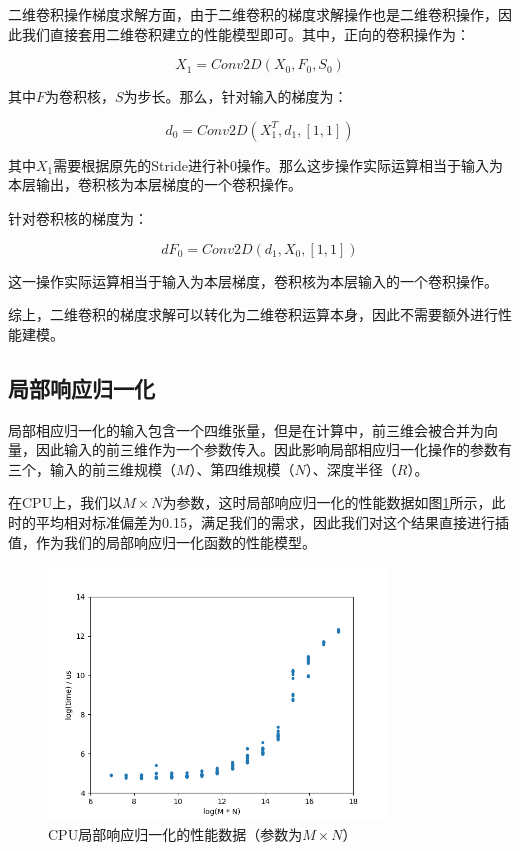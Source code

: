     二维卷积操作梯度求解方面，由于二维卷积的梯度求解操作也是二维卷积操作，因此我们直接套用二维卷积建立的性能模型即可。其中，正向的卷积操作为：
    
    $$
        X_1 = Conv2D(X_0, F_0, S_0)
    $$
    
    其中$ F $为卷积核，$ S $为步长。那么，针对输入的梯度为：
    
    $$
        d_0 = Conv2D(X_1^T, d_1, [1, 1])
    $$
    
    其中$ X_1 $需要根据原先的Stride进行补0操作。那么这步操作实际运算相当于输入为本层输出，卷积核为本层梯度的一个卷积操作。
    
    针对卷积核的梯度为：
    
    $$
        dF_0 = Conv2D(d_1, X_0, [1, 1])
    $$

    这一操作实际运算相当于输入为本层梯度，卷积核为本层输入的一个卷积操作。
    
    综上，二维卷积的梯度求解可以转化为二维卷积运算本身，因此不需要额外进行性能建模。
    
\subsection{局部响应归一化}
    局部相应归一化的输入包含一个四维张量，但是在计算中，前三维会被合并为向量，因此输入的前三维作为一个参数传入。因此影响局部相应归一化操作的参数有三个，输入的前三维规模（$ M $）、第四维规模（$ N $）、深度半径（$ R $）。
    
    在CPU上，我们以$ M \times N $为参数，这时局部响应归一化的性能数据如图\ref{fig:lrn_cpu}所示，此时的平均相对标准偏差为0.15，满足我们的需求，因此我们对这个结果直接进行插值，作为我们的局部响应归一化函数的性能模型。
    
    \begin{figure}[!htbp]
        \centering
        \includegraphics[width=0.8\textwidth]{figures/lrn_cpu.png}
        \caption{CPU局部响应归一化的性能数据（参数为$ M \times N $）}
        \label{fig:lrn_cpu}
    \end{figure}

